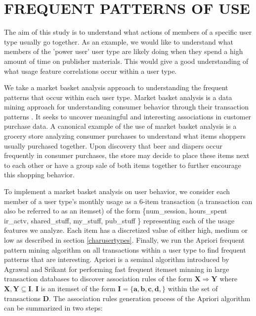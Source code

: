 \documentclass{acm_proc_article-sp}
\begin{document}
\section{FREQUENT PATTERNS OF USE}
The aim of this study is to understand what actions of members of a specific user type usually go together. As an example, we would like to understand what members of the 'power user' user type are likely doing when they spend a high amount of time on publisher materials. This would give a good understanding of what usage feature correlations occur within a user type.

We take a market basket analysis approach to understanding the frequent patterns that occur within each user type. Market basket analysis is a data mining approach for understanding consumer behavior through their transaction patterns \cite{han2006data}. It seeks to uncover meaningful and interesting associations in customer purchase data. A canonical example of the use of  market basket analysis is a grocery store analyzing consumer purchases to understand what items shoppers usually purchased together. Upon discovery that beer and diapers occur frequently in consumer purchases, the store may decide to place these items next to each other or have a group sale of both items together to further encourage this shopping behavior.

To implement a market basket analysis on user behavior, we consider each member of a user type's monthly usage as a 6-item transaction (a transaction can also be referred to as an itemset) of the form \{num\_session, hours\_spent ir\_actv, shared\_stuff, my\_stuff, pub\_stuff \} representing each of the usage features we analyze. Each item has a discretized value of either high, medium or low as described in section \ref{charusertypes}. Finally, we run the Apriori frequent pattern mining algorithm on all transactions within a user type to find frequent patterns that are interesting. Apriori is a seminal algorithm introduced by Agrawal and Srikant \cite{agrawal} for performing fast frequent itemset minning in large transaction databases to discover association rules of the form $\mathbf{{X} \Longrightarrow {Y}}$ where $\mathbf{X, Y \subseteq I}$. $\mathbf{I}$ is an itemset of the form $\mathbf{I = \{a,b,c,d,\}}$ within the set of transactions $\mathbf{D}$.
The association rules generation process of the Apriori algorithm can be summarized in two steps:
\end{document}

